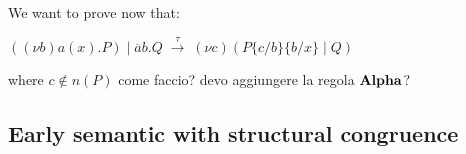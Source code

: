 \begin{example}
    We want to prove now that:
    \begin{center}
      $((\nu b) a(x).P)\; |\; \overline{a}b.Q\; \xrightarrow{\tau}\; (\nu c) (P\{c/b\}\{b/x\}\; |\; Q)$
    \end{center}
    where $c\notin n(P)$
  come faccio? devo aggiungere la regola $\bf{Alpha}$?
\end{example}


%   



\subsection{Early semantic with structural congruence}

